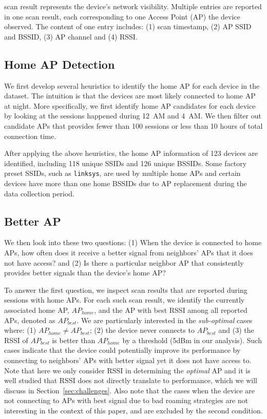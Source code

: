 \wifi{} scan result represents the device's network visibility. Multiple entries
are reported in one scan result, each corresponding to one \wifi{} Access Point
(AP) the device observed. The content of one entry includes: (1) scan timestamp,
(2) AP SSID and BSSID, (3) AP channel and (4) RSSI.

\subsection{Home AP Detection}
\label{subsec:homeap}

We first develop several heuristics to identify the home AP for each device in
the dataset. The intuition is that the devices are most likely connected to
home AP at night. More specifically, we first identify home AP candidates for
each device by looking at the \wifi{} sessions happened during 12~AM and 4~AM.
We then filter out candidate APs that provides fewer than 100 sessions or less
than 10 hours of total connection time.

After applying the above heuristics, the home AP information of 123 devices are
identified, including 118 unique SSIDs and 126 unique BSSIDs. Some factory
preset SSIDs, such as \texttt{linksys}, are used by multiple home APs and
certain devices have more than one home BSSIDs due to AP replacement during the
data collection period.

\subsection{Better AP}
\label{subsec:better}

We then look into these two questions: (1) When the device is connected to home
APs, how often does it receive a better signal from neighbors' APs that it does
not have access? and (2) Is there a particular neighbor AP that consistently
provides better signals than the device's home AP?

To answer the first question, we inspect scan results that are reported during
\wifi{} sessions with home APs. For each such scan result, we identify the
currently associated home AP, $AP_{home}$, and the AP with best RSSI among all
reported APs, denoted as $AP_{best}$. We are particularly interested in the
\textit{sub-optimal} cases where: (1) $AP_{home} \neq AP_{best}$; (2) the device
never connects to $AP_{best}$ and (3) the RSSI of $AP_{best}$ is
better than $AP_{home}$ by a threshold (5dBm in our analysis). Such cases indicate that the
device could potentially improve its \wifi{} performance by connecting to
neighbors' APs with better signal yet it does not have access to. Note that here we
only consider RSSI in determining the \textit{optimal} AP and it is well studied that
RSSI does not directly translate to \wifi{} performance, which we will discuss
in Section~\ref{sec:challenges}. Also note that the cases when the device are not
connecting to APs with best signal due to bad roaming strategies are not
interesting in the context of this paper, and are excluded by the second condition.

